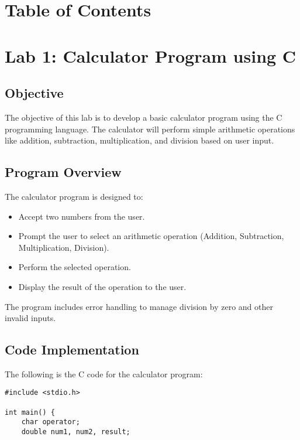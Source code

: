 \documentclass[a4paper,15pt]{article}
\begin{document}
\begin{itemize}[leftmargin=1.5cm]
\vspace{1cm}

\section*{Table of Contents}
\tableofcontents

\vspace{1cm}

\newpage

\section{Lab 1: Calculator Program using C}

\subsection{Objective}
The objective of this lab is to develop a basic calculator program using the C programming language. The calculator will perform simple arithmetic operations like addition, subtraction, multiplication, and division based on user input.

\subsection{Program Overview}
The calculator program is designed to:
\begin{itemize}
    \item Accept two numbers from the user.
    \item Prompt the user to select an arithmetic operation (Addition, Subtraction, Multiplication, Division).
    \item Perform the selected operation.
    \item Display the result of the operation to the user.
\end{itemize}

The program includes error handling to manage division by zero and other invalid inputs.

\subsection{Code Implementation}
The following is the C code for the calculator program:

\begin{verbatim}
#include <stdio.h>

int main() {
    char operator;
    double num1, num2, result;


\end{verbatim}
\end{itemize}
\end{document}
